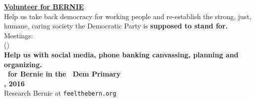 \newcommand{\checkbox}{\makebox[0pt][l]{$\square$}\raisebox{.15ex}{\hspace{0.1em}$\checkmark$}}

\vspace{-10pt}

\begin{center}
  {\huge\bf\underline{Volunteer for BERNIE}}\\[10pt]

  Help us take back democracy for working people and re-establish the
  strong, just, humane, caring society the Democratic Party is {\bf
    supposed to stand for.}\\[10pt]

Meetings: \MeetingTime\ \MeetingAddress\\
(\MeetingPlacename)\\[10pt]

{\bf
Help us with social media, phone banking
canvassing, planning and organizing.\\[10pt]

\Vote\ for Bernie in the \State\ Dem Primary\\
\PDate, 2016
}\\[10pt]

Research Bernie at {\tt feelthebern.org}\\[10pt]

\ContactInfo
\vspace{-35pt}
\end{center}	

